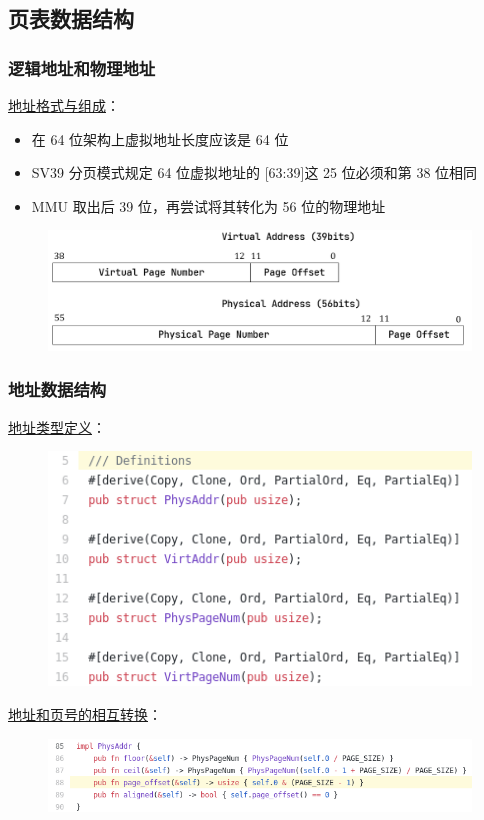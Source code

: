 \subsection{页表数据结构}
% 
\begin{frame}
    \frametitle{逻辑地址和物理地址}
% 
\href{https://rcore-os.github.io/rCore-Tutorial-Book-v3/chapter4/3sv39-implementation-1.html\#id3}{地址格式与组成}：
% 
        \begin{itemize}
        \item 在 64 位架构上虚拟地址长度应该是 64 位
        \item SV39 分页模式规定 64 位虚拟地址的 [63:39]这 25 位必须和第 38 位相同
        \item MMU 取出后 39 位，再尝试将其转化为 56 位的物理地址
        \end{itemize}
    \begin{figure}
        \centering
        \includegraphics[width=0.8\linewidth]{figs/sv39-va-pa.png}
    \end{figure}
% 
% 
% 
\end{frame}
\begin{frame}
    \frametitle{地址数据结构}
\href{https://github.com/rcore-os/rCore-Tutorial-v3/blob/ch4/os/src/mm/address.rs\#L5}{地址类型定义}：%
    \begin{figure}
        \centering
        \includegraphics[width=0.4\linewidth]{figs/address-5.png}
    \end{figure}
% 
% 
\href{https://github.com/rcore-os/rCore-Tutorial-v3/blob/ch4/os/src/mm/address.rs\#L88}{地址和页号的相互转换}：
    \begin{figure}
        \centering
        \includegraphics[width=0.7\linewidth]{figs/address-88.png}
    \end{figure}
% 
% 
\end{frame}
